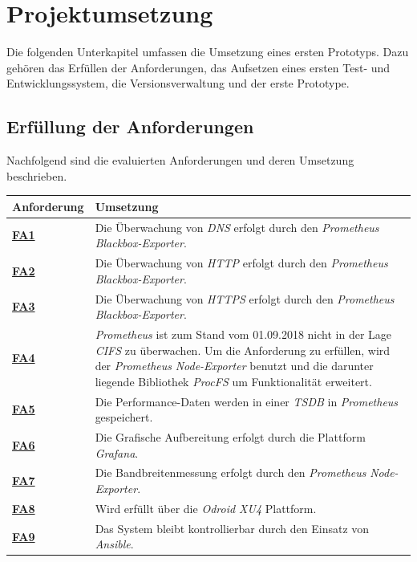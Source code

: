 \documentclass[titlepage]{report}
\begin{document}
\chapter{Projektumsetzung}
Die folgenden Unterkapitel umfassen die Umsetzung eines ersten
Prototyps. Dazu gehören das Erfüllen der Anforderungen, das Aufsetzen
eines ersten Test- und Entwicklungssystem, die Versionsverwaltung
und der erste Prototype.
\section{Erfüllung der Anforderungen}
Nachfolgend sind die evaluierten Anforderungen und deren Umsetzung
beschrieben.
\tabulinesep=1.2mm
\begin{center}
    \begin{tabu}{X[-1] X}
\toprule
\textbf{Anforderung} & \textbf{Umsetzung}  \\
\midrule
        \hyperref[table:FA1]{\textbf{FA1}} & Die Überwachung von \emph{DNS} erfolgt durch den \emph{Prometheus} \emph{Blackbox-Exporter}. \\
        \hyperref[table:FA2]{\textbf{FA2}} & Die Überwachung von \emph{HTTP} erfolgt durch den \emph{Prometheus} \emph{Blackbox-Exporter}. \\
        \hyperref[table:FA3]{\textbf{FA3}} & Die Überwachung von \emph{HTTPS} erfolgt durch den \emph{Prometheus} \emph{Blackbox-Exporter}. \\
        \hyperref[table:FA4]{\textbf{FA4}} & \emph{Prometheus} ist zum Stand vom 01.09.2018 nicht in der Lage \emph{CIFS} zu überwachen. Um die Anforderung zu erfüllen, wird der \emph{Prometheus} \emph{Node-Exporter} benutzt und die darunter liegende Bibliothek \emph{ProcFS} um Funktionalität erweitert. \\
        \hyperref[table:FA5]{\textbf{FA5}} & Die Performance-Daten werden in einer \emph{TSDB} in \emph{Prometheus} gespeichert. \\
        \hyperref[table:FA6]{\textbf{FA6}} & Die Grafische Aufbereitung erfolgt durch die Plattform \emph{Grafana}. \\
        \hyperref[table:FA7]{\textbf{FA7}} & Die Bandbreitenmessung erfolgt durch den \emph{Prometheus} \emph{Node-Exporter}. \\
        \hyperref[table:FA8]{\textbf{FA8}} & Wird erfüllt über die \emph{Odroid XU4} Plattform. \\
        \hyperref[table:FA9]{\textbf{FA9}} & Das System bleibt kontrollierbar durch den Einsatz von \emph{Ansible}. \\
\bottomrule
    \end{tabu}
    \label{table:mapping1}
\end{center}
\end{document}

